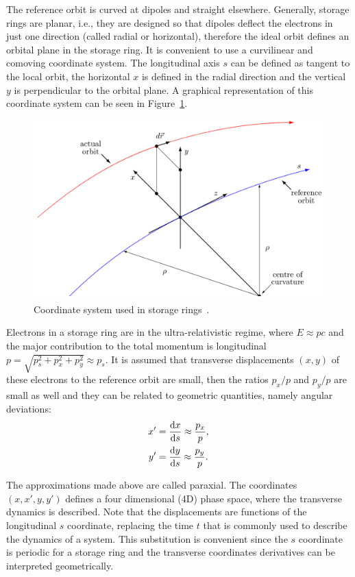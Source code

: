 The reference orbit is curved at dipoles and straight elsewhere. Generally, storage rings are planar, i.e., they are designed so that dipoles deflect the electrons in just one direction (called radial or horizontal), therefore the ideal orbit defines an orbital plane in the storage ring. It is convenient to use a curvilinear and comoving coordinate system. The longitudinal axis $s$ can be defined as tangent to the local orbit, the horizontal $x$ is defined in the radial direction and the vertical $y$ is perpendicular to the orbital plane. A graphical representation of this coordinate system can be seen in Figure~\ref{syst}.
\begin{figure}
    \centering
    \includegraphics[scale=0.25]{figures/reference_system.png}
    \caption{Coordinate system used in storage rings~\cite{madx}.}
    \label{syst}
\end{figure}

Electrons in a storage ring are in the ultra-relativistic regime, where $E \approx pc$ and the major contribution to the total momentum is longitudinal $p = \sqrt{p_s^2 + p_x^2 + p_y^2} \approx p_s$. It is assumed that transverse displacements $(x, y)$ of these electrons to the reference orbit are small, then the ratios $p_x/p$ and $p_y/p$ are small as well and they can be related to geometric quantities, namely angular deviations:
\begin{align*}
    x' &= \frac{\mathrm{d} x}{\mathrm{d} s} \approx \frac{p_x}{p}, \\
    y' &= \frac{\mathrm{d} y}{\mathrm{d} s} \approx \frac{p_y}{p}.
\end{align*}

The approximations made above are called paraxial. The coordinates $(x, x', y, y')$ defines a four dimensional (4D) phase space, where the transverse dynamics is described. Note that the displacements are functions of the longitudinal $s$ coordinate, replacing the time $t$ that is commonly used to describe the dynamics of a system. This substitution is convenient since the $s$ coordinate is periodic for a storage ring and the transverse coordinates derivatives can be interpreted geometrically.

